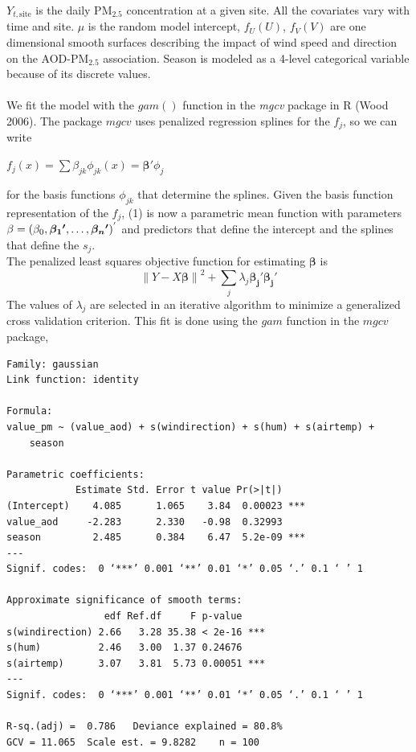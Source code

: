 \documentclass[10pt]{article}
\def\PM{{\mathrm{PM_{2.5}}}}
\begin{document}
$Y_{t, \text{site}}$ is the daily $\PM$ concentration at a given site. All the covariates vary with time and site. $\mu$ is the random model intercept, $f_{U}(U)$, $f_{V}(V)$ are one dimensional smooth surfaces describing the impact of wind speed and direction on the AOD-$\PM$ association. Season is modeled as a 4-level categorical variable because of its discrete values. \\ \\
We fit the model with the $gam()$ function in the {\textit{mgcv}} package in R (Wood 2006). The package ${mgcv}$ uses penalized regression splines for the $f_{j}$, so we can write
\begin{center} 
$f_{j}(x) = \sum \beta_{jk} {\phi_{jk}}(x) = {\bm{\beta{'}}}{\phi_j}$
\end{center} 
for the basis functions ${\phi_{jk}}$ that determine the splines. Given the basis function representation of the $f_j$, (1) is now a parametric mean function with parameters ${\bf{\beta}} = (\beta_0, {\bm{\beta_1{'}}}, \ldots, {\bm{\beta_n{'}}})^{'}$ and predictors that define the intercept and the splines that define the $s_j$.  \\
The penalized least squares objective function for estimating ${\bm{\beta}}$ is 
\begin{equation} 
{\lVert Y - X{\bm{\beta}}\rVert}^{2} + \sum_{j}\lambda_{j}{\bm{\beta_{j}{'}}}{\bm{\beta_{j}{'}}}
\end{equation}
The values of $\lambda_{j}$ are selected in an iterative algorithm to minimize a generalized cross validation criterion. This fit is done using the ${gam}$ function in the ${mgcv}$ package, 
\begin{verbatim}
Family: gaussian 
Link function: identity 

Formula:
value_pm ~ (value_aod) + s(windirection) + s(hum) + s(airtemp) + 
    season

Parametric coefficients:
            Estimate Std. Error t value Pr(>|t|)    
(Intercept)    4.085      1.065    3.84  0.00023 ***
value_aod     -2.283      2.330   -0.98  0.32993    
season         2.485      0.384    6.47  5.2e-09 ***
---
Signif. codes:  0 ‘***’ 0.001 ‘**’ 0.01 ‘*’ 0.05 ‘.’ 0.1 ‘ ’ 1

Approximate significance of smooth terms:
                 edf Ref.df     F p-value    
s(windirection) 2.66   3.28 35.38 < 2e-16 ***
s(hum)          2.46   3.00  1.37 0.24676    
s(airtemp)      3.07   3.81  5.73 0.00051 ***
---
Signif. codes:  0 ‘***’ 0.001 ‘**’ 0.01 ‘*’ 0.05 ‘.’ 0.1 ‘ ’ 1

R-sq.(adj) =  0.786   Deviance explained = 80.8%
GCV = 11.065  Scale est. = 9.8282    n = 100
\end{verbatim} 
\end{document}
